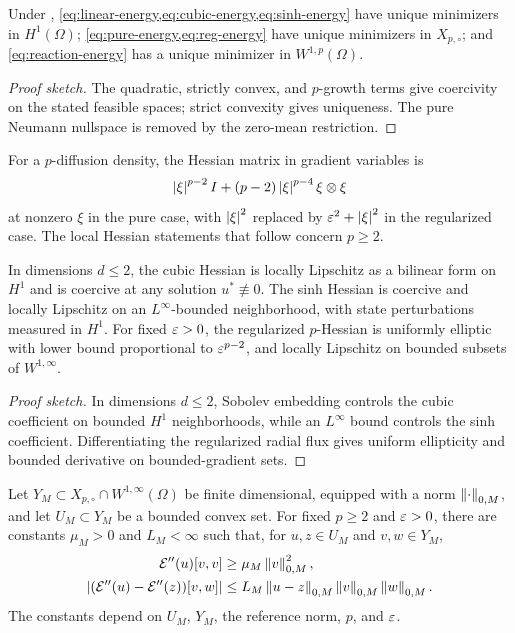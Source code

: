 \begin{proposition}
\label{prop:wellposedness}
Under , \cref{eq:linear-energy,eq:cubic-energy,eq:sinh-energy} have unique minimizers
in \(H^1(\Omega)\); \cref{eq:pure-energy,eq:reg-energy} have unique minimizers in \(X_{p,\circ}\); and
\cref{eq:reaction-energy} has a unique minimizer in \(W^{1,p}(\Omega)\).
\end{proposition}

\begin{proof}[Proof sketch]
The quadratic, strictly convex, and $p$-growth terms give coercivity on the stated feasible spaces; strict convexity gives uniqueness.  The pure Neumann nullspace is removed by the zero-mean restriction.
\end{proof}

For a \(p\)-diffusion density, the Hessian matrix in gradient variables is
\[
 \left|\xi\right|^{p-2}I+(p-2)\left|\xi\right|^{p-4}\xi\otimes\xi
\]
at nonzero \(\xi\) in the pure case, with \(\left|\xi\right|^2\) replaced by
\(\varepsilon^2+\left|\xi\right|^2\) in the regularized case. The local Hessian statements that follow concern
\(p\geq2\).

\begin{proposition}
\label{prop:model-hessian}
In dimensions \(d\leq2\), the cubic Hessian is locally Lipschitz as a bilinear form on \(H^1\) and is coercive at any solution \(u^*\not\equiv0\). The sinh Hessian is coercive and locally Lipschitz on an \(L^\infty\)-bounded neighborhood, with state perturbations measured in \(H^1\). For fixed \(\varepsilon>0\), the regularized \(p\)-Hessian is uniformly elliptic with lower bound proportional to \(\varepsilon^{p-2}\), and locally Lipschitz on bounded subsets of \(W^{1,\infty}\).
\end{proposition}

\begin{proof}[Proof sketch]
In dimensions $d\leq2$, Sobolev embedding controls the cubic coefficient on bounded $H^1$ neighborhoods, while an $L^\infty$ bound controls the sinh coefficient.  Differentiating the regularized radial flux gives uniform ellipticity and bounded derivative on bounded-gradient sets.
\end{proof}

\begin{proposition}
\label{prop:regularized-restricted}
Let \(Y_M\subset X_{p,\circ}\cap W^{1,\infty}(\Omega)\) be finite dimensional, equipped with a norm \(\left\lVert \cdot\right\rVert_{0,M}\), and let \(U_M\subset Y_M\) be a bounded convex set. For fixed \(p\ge2\) and \(\varepsilon>0\), there are constants \(\mu_M>0\) and \(L_M<\infty\) such that, for \(u,z\in U_M\) and \(v,w\in Y_M\),
\[
 \begin{aligned}
 \mathcal{E}''(u)[v,v]&\ge\mu_M\left\lVert v\right\rVert_{0,M}^2,\\
 |(\mathcal{E}''(u)-\mathcal{E}''(z))[v,w]|
 &\le L_M\left\lVert u-z\right\rVert_{0,M}\left\lVert v\right\rVert_{0,M}\left\lVert w\right\rVert_{0,M}.
 \end{aligned}
\]
The constants depend on \(U_M\), \(Y_M\), the reference norm, \(p\), and \(\varepsilon\).
\end{proposition}

